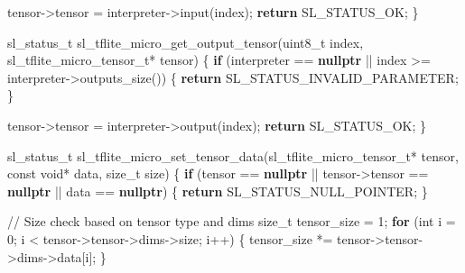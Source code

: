 \documentclass[
  9pt,
  letterpaper,
  abstract,
  titlepage]{scrbook}
\newenvironment{Shaded}{\begin{snugshade}}{\end{snugshade}}
\newcommand{\CommentTok}[1]{\textcolor[rgb]{0.37,0.37,0.37}{#1}}
\newcommand{\ControlFlowTok}[1]{\textcolor[rgb]{0.00,0.23,0.31}{\textbf{#1}}}
\newcommand{\DataTypeTok}[1]{\textcolor[rgb]{0.68,0.00,0.00}{#1}}
\newcommand{\DecValTok}[1]{\textcolor[rgb]{0.68,0.00,0.00}{#1}}
\newcommand{\KeywordTok}[1]{\textcolor[rgb]{0.00,0.23,0.31}{\textbf{#1}}}
\newcommand{\NormalTok}[1]{\textcolor[rgb]{0.00,0.23,0.31}{#1}}
\newcommand{\OperatorTok}[1]{\textcolor[rgb]{0.37,0.37,0.37}{#1}}
\begin{document}
\begin{Shaded}
\begin{Highlighting}[]
\NormalTok{  tensor}\OperatorTok{{-}\textgreater{}}\NormalTok{tensor }\OperatorTok{=}\NormalTok{ interpreter}\OperatorTok{{-}\textgreater{}}\NormalTok{input}\OperatorTok{(}\NormalTok{index}\OperatorTok{);}
  \ControlFlowTok{return}\NormalTok{ SL\_STATUS\_OK}\OperatorTok{;}
\OperatorTok{\}}

\NormalTok{sl\_status\_t sl\_tflite\_micro\_get\_output\_tensor}\OperatorTok{(}\DataTypeTok{uint8\_t}\NormalTok{ index}\OperatorTok{,}\NormalTok{ sl\_tflite\_micro\_tensor\_t}\OperatorTok{*}\NormalTok{ tensor}\OperatorTok{)}
\OperatorTok{\{}
  \ControlFlowTok{if} \OperatorTok{(}\NormalTok{interpreter }\OperatorTok{==} \KeywordTok{nullptr} \OperatorTok{||}\NormalTok{ index }\OperatorTok{\textgreater{}=}\NormalTok{ interpreter}\OperatorTok{{-}\textgreater{}}\NormalTok{outputs\_size}\OperatorTok{())} \OperatorTok{\{}
    \ControlFlowTok{return}\NormalTok{ SL\_STATUS\_INVALID\_PARAMETER}\OperatorTok{;}
  \OperatorTok{\}}
  
\NormalTok{  tensor}\OperatorTok{{-}\textgreater{}}\NormalTok{tensor }\OperatorTok{=}\NormalTok{ interpreter}\OperatorTok{{-}\textgreater{}}\NormalTok{output}\OperatorTok{(}\NormalTok{index}\OperatorTok{);}
  \ControlFlowTok{return}\NormalTok{ SL\_STATUS\_OK}\OperatorTok{;}
\OperatorTok{\}}

\NormalTok{sl\_status\_t sl\_tflite\_micro\_set\_tensor\_data}\OperatorTok{(}\NormalTok{sl\_tflite\_micro\_tensor\_t}\OperatorTok{*}\NormalTok{ tensor}\OperatorTok{,} 
                                            \DataTypeTok{const} \DataTypeTok{void}\OperatorTok{*}\NormalTok{ data}\OperatorTok{,} 
                                            \DataTypeTok{size\_t}\NormalTok{ size}\OperatorTok{)}
\OperatorTok{\{}
  \ControlFlowTok{if} \OperatorTok{(}\NormalTok{tensor }\OperatorTok{==} \KeywordTok{nullptr} \OperatorTok{||}\NormalTok{ tensor}\OperatorTok{{-}\textgreater{}}\NormalTok{tensor }\OperatorTok{==} \KeywordTok{nullptr} \OperatorTok{||}\NormalTok{ data }\OperatorTok{==} \KeywordTok{nullptr}\OperatorTok{)} \OperatorTok{\{}
    \ControlFlowTok{return}\NormalTok{ SL\_STATUS\_NULL\_POINTER}\OperatorTok{;}
  \OperatorTok{\}}
  
  \CommentTok{// Size check based on tensor type and dims}
  \DataTypeTok{size\_t}\NormalTok{ tensor\_size }\OperatorTok{=} \DecValTok{1}\OperatorTok{;}
  \ControlFlowTok{for} \OperatorTok{(}\DataTypeTok{int}\NormalTok{ i }\OperatorTok{=} \DecValTok{0}\OperatorTok{;}\NormalTok{ i }\OperatorTok{\textless{}}\NormalTok{ tensor}\OperatorTok{{-}\textgreater{}}\NormalTok{tensor}\OperatorTok{{-}\textgreater{}}\NormalTok{dims}\OperatorTok{{-}\textgreater{}}\NormalTok{size}\OperatorTok{;}\NormalTok{ i}\OperatorTok{++)} \OperatorTok{\{}
\NormalTok{    tensor\_size }\OperatorTok{*=}\NormalTok{ tensor}\OperatorTok{{-}\textgreater{}}\NormalTok{tensor}\OperatorTok{{-}\textgreater{}}\NormalTok{dims}\OperatorTok{{-}\textgreater{}}\NormalTok{data}\OperatorTok{[}\NormalTok{i}\OperatorTok{];}
  \OperatorTok{\}}
  

\end{Highlighting}
\end{Shaded}
\end{document}
